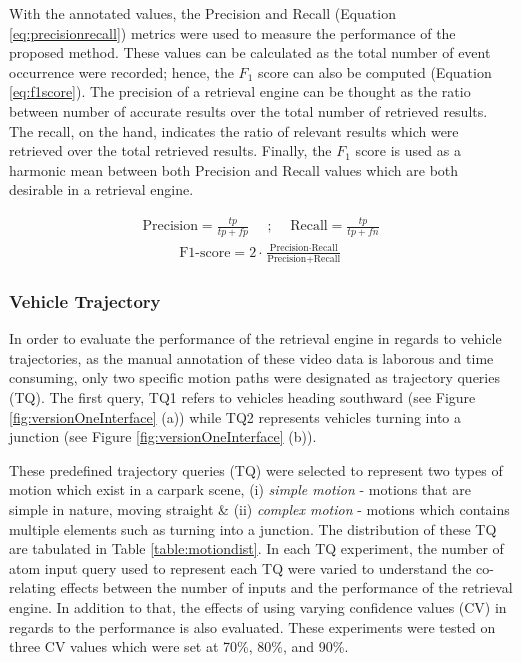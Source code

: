 With the annotated values, the Precision and Recall (Equation \ref{eq:precisionrecall}) metrics were used to measure the performance of the proposed method. These values can be calculated as the total number of event occurrence were recorded; hence, the $F_1$ score can also be computed (Equation \ref{eq:f1score}). The precision of a retrieval engine can be thought as the ratio between number of accurate results over the total number of retrieved results. The recall, on the hand, indicates the ratio of relevant results which were retrieved over the total retrieved results. Finally, the $F_1$ score is used as a harmonic mean between both Precision and Recall values which are both desirable in a retrieval engine.

\begin{align}
\label{eq:precisionrecall}
    \text{Precision} = \frac{tp}{tp + fp}   \hspace{1em} \text{ ; }  \hspace{1em} \text{Recall}  = \frac{tp}{tp + fn}
\end{align}
\begin{align}
\label{eq:f1score}
\text{F1-score}  = 2\cdot\frac{\text{Precision} \cdot \text{Recall}}{\text{Precision} + \text{Recall}}
\end{align}



\subsubsection{Vehicle Trajectory}

In order to evaluate the performance of the retrieval engine in regards to vehicle trajectories, as the manual annotation of these video data is laborous and time consuming, only two specific motion paths were designated as trajectory queries (TQ). The first query, TQ1 refers to vehicles heading southward (see Figure \ref{fig:versionOneInterface} (a)) while TQ2 represents vehicles turning into a junction (see Figure \ref{fig:versionOneInterface} (b)). 

These predefined trajectory queries (TQ) were selected to represent two types of motion which exist in a carpark scene, (i) \textit{simple motion} - motions that are simple in nature, moving straight \& (ii) \textit{complex motion} - motions which contains multiple elements such as turning into a junction. The distribution of these TQ are tabulated in Table \ref{table:motiondist}. In each TQ experiment, the number of atom input query used to represent each TQ were varied to understand the co-relating effects between the number of inputs and the performance of the retrieval engine. In addition to that, the effects of using varying confidence values (CV) in regards to the performance is also evaluated. These experiments were tested on three CV values which were set at 70\%, 80\%, and 90\%.


